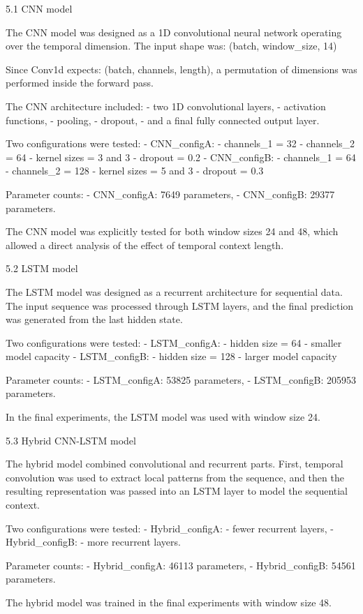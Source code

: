 5.1 CNN model

The CNN model was designed as a 1D convolutional neural network operating over the temporal dimension. The input shape was:
(batch, window_size, 14)

Since Conv1d expects:
(batch, channels, length),
a permutation of dimensions was performed inside the forward pass.

The CNN architecture included:
- two 1D convolutional layers,
- activation functions,
- pooling,
- dropout,
- and a final fully connected output layer.

Two configurations were tested:
- CNN_configA:
  - channels_1 = 32
  - channels_2 = 64
  - kernel sizes = 3 and 3
  - dropout = 0.2
- CNN_configB:
  - channels_1 = 64
  - channels_2 = 128
  - kernel sizes = 5 and 3
  - dropout = 0.3

Parameter counts:
- CNN_configA: 7649 parameters,
- CNN_configB: 29377 parameters.

The CNN model was explicitly tested for both window sizes 24 and 48, which allowed a direct analysis of the effect of temporal context length.

5.2 LSTM model

The LSTM model was designed as a recurrent architecture for sequential data. The input sequence was processed through LSTM layers, and the final prediction was generated from the last hidden state.

Two configurations were tested:
- LSTM_configA:
  - hidden size = 64
  - smaller model capacity
- LSTM_configB:
  - hidden size = 128
  - larger model capacity

Parameter counts:
- LSTM_configA: 53825 parameters,
- LSTM_configB: 205953 parameters.

In the final experiments, the LSTM model was used with window size 24.

5.3 Hybrid CNN-LSTM model

The hybrid model combined convolutional and recurrent parts. First, temporal convolution was used to extract local patterns from the sequence, and then the resulting representation was passed into an LSTM layer to model the sequential context.

Two configurations were tested:
- Hybrid_configA:
  - fewer recurrent layers,
- Hybrid_configB:
  - more recurrent layers.

Parameter counts:
- Hybrid_configA: 46113 parameters,
- Hybrid_configB: 54561 parameters.

The hybrid model was trained in the final experiments with window size 48.

